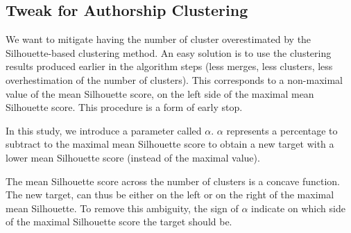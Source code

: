 \begin{table}
  \centering
  \caption{Silhouette-based clustering evaluation (Maximal Silhouette, $\alpha = 0$), mean $B^3_{F_1}$/$r_{diff}$}
  \label{tab:silhouette-based_clustering}

\end{table}

\subsection{Tweak for Authorship Clustering}

We want to mitigate having the number of cluster overestimated by the Silhouette-based clustering method.
An easy solution is to use the clustering results produced earlier in the algorithm steps (less merges, less clusters, less overhestimation of the number of clusters).
This corresponds to a non-maximal value of the mean Silhouette score, on the left side of the maximal mean Silhouette score.
This procedure is a form of early stop.

In this study, we introduce a parameter called $\alpha$.
$\alpha$ represents a percentage to subtract to the maximal mean Silhouette score to obtain a new target with a lower mean Silhouette score (instead of the maximal value).

The mean Silhouette score across the number of clusters is a concave function.
The new target, can thus be either on the left or on the right of the maximal mean Silhouette.
To remove this ambiguity, the sign of $\alpha$ indicate on which side of the maximal Silhouette score the target should be.

